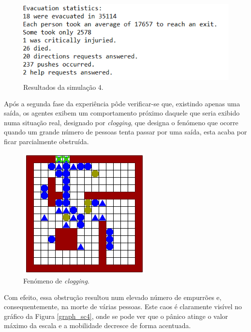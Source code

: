 \documentclass[12pt]{article}
\begin{document}
\begin{titlepage}
\begin{itemize}
\begin{figure}[H]
	\centering
	\includegraphics{log_sc4.png}
	\caption{Resultados da simulação 4.}
	\label{log_sc4}
\end{figure}

Após a segunda fase da experiência pôde verificar-se que, existindo apenas uma saída, os agentes exibem um comportamento próximo daquele que seria exibido numa situação real, designado por \textit{clogging}, que designa o fenómeno que ocorre quando um grande número de pessoas tenta passar por uma saída, esta acaba por ficar parcialmente obstruída. 

\begin{figure}[H]
	\centering
	\includegraphics[scale=1.1]{clogging.png}
	\caption{Fenómeno de \textit{clogging}.}
	\label{clog}
\end{figure}

Com efeito, essa obstrução resultou num elevado número de empurrões e, consequentemente, na morte de várias pessoas. Este caos é claramente visível no gráfico da Figura \ref{graph_sc4}, onde se pode ver que o pânico atinge o valor máximo da escala e a mobilidade decresce de forma acentuada.


\end{itemize}
\end{titlepage}
\end{document}
